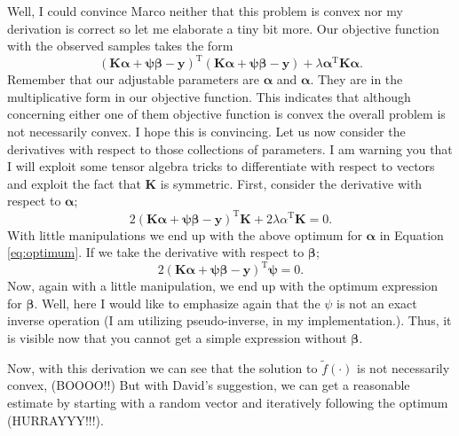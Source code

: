 \documentclass{tran-l}
\theoremstyle{definition}
\theoremstyle{remark}
\numberwithin{equation}{section}
\begin{document}
{\rem Well, I could convince Marco neither that this problem is convex nor my derivation is correct so let me elaborate a tiny bit more. Our objective function with the observed samples takes the form
\begin{equation}
  (\mathbf{K}\boldsymbol{\alpha}+\boldsymbol{\psi\beta}-\mathbf{y})^\text{T}(\mathbf{K}\boldsymbol{\alpha}+\boldsymbol{\psi\beta}-\mathbf{y}) + \lambda\boldsymbol{\alpha}^\text{T}\mathbf{K}\boldsymbol{\alpha}.
\end{equation}
Remember that our adjustable parameters are $\boldsymbol{\alpha}$ and $\boldsymbol{\alpha}$. They are in the multiplicative form in our objective function. This indicates that although concerning either one of them objective function is convex the overall problem is not necessarily convex. I hope this is convincing. Let us now consider the derivatives with respect to those collections of parameters. I am warning you that I will exploit some tensor algebra tricks to differentiate with respect to vectors and exploit the fact that $\mathbf{K}$ is symmetric. First, consider the derivative with respect to $\boldsymbol{\alpha}$;
\begin{equation}
  2(\mathbf{K}\boldsymbol{\alpha}+\boldsymbol{\psi\beta}-\mathbf{y})^\text{T}\mathbf{K}+2\lambda\alpha^\text{T}\mathbf{K}=0.
\end{equation}
With little manipulations we end up with the above optimum for $\boldsymbol{\alpha}$ in Equation \ref{eq:optimum}. If we take the derivative with respect to $\boldsymbol{\beta}$;
\begin{equation}
  2(\mathbf{K}\boldsymbol{\alpha}+\boldsymbol{\psi\beta}-\mathbf{y})^\text{T}\boldsymbol{\psi}=0.
\end{equation}
Now, again with a little manipulation, we end up with the optimum expression for $\boldsymbol{\beta}$. Well, here I would like to emphasize again that the $\psi$ is not an exact inverse operation (I am utilizing pseudo-inverse, in my implementation.). Thus, it is visible now that you cannot get a simple expression without $\boldsymbol{\beta}$. 

\color{black}

\rem Now, with this derivation we  can see that the solution to $\tilde{f}(\cdot)$ is not necessarily convex, (BOOOO!!) But with David's suggestion, we can get a reasonable estimate by starting with a random vector and iteratively following the optimum (HURRAYYY!!!). 

}
\end{document}
